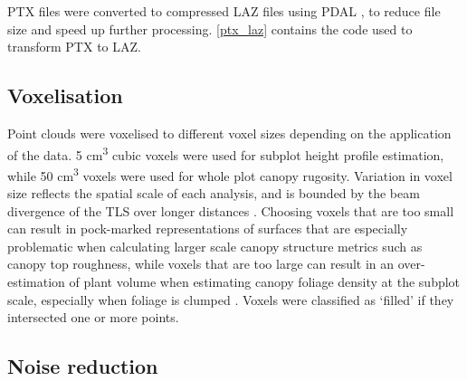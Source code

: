 \documentclass[11pt,a4paper]{article}
\begin{document}


PTX files were converted to compressed LAZ files using PDAL \citep{PDAL}, to reduce file size and speed up further processing. \autoref{ptx_laz} contains the code used to transform PTX to LAZ. 

\vspace{\baselineskip}
\begin{minipage}{\linewidth}

\end{minipage}

\vspace{\baselineskip}
\begin{minipage}{\linewidth}
	
\end{minipage}

\subsection{Voxelisation}

Point clouds were voxelised to different voxel sizes depending on the application of the data. 5 cm\textsuperscript{3} cubic voxels were used for subplot height profile estimation, while 50 cm\textsuperscript{3} voxels were used for whole plot canopy rugosity. Variation in voxel size reflects the spatial scale of each analysis, and is bounded by the beam divergence of the TLS over longer distances \citep{Grau2017}. Choosing voxels that are too small can result in pock-marked representations of surfaces that are especially problematic when calculating larger scale canopy structure metrics such as canopy top roughness, while voxels that are too large can result in an over-estimation of plant volume when estimating canopy foliage density at the subplot scale, especially when foliage is clumped \citep{Seidel2012, Cifuentes2014}. Voxels were classified as `filled' if they intersected one or more points. 

\subsection{Noise reduction}
\end{document}
